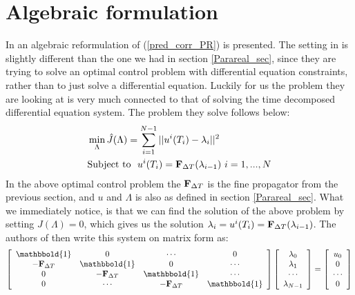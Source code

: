 \section{Algebraic formulation}\label{algebraic_sec}
In \cite{maday2002parareal} an algebraic reformulation of (\ref{pred_corr_PR}) is presented. The setting in \cite{maday2002parareal} is slightly different than the one we had in section \ref{Parareal_sec}, since they are trying to solve an optimal control problem with differential equation constraints, rather than to just solve a differential equation. Luckily for us the problem they are looking at is very much connected to that of solving the time decomposed differential equation system. The problem they solve follows below:
\begin{align*}
&\min_{\Lambda}\hat{J}(\Lambda) = \sum_{i=1}^{N-1} ||u^{i}(T_{i})-\lambda_{i}||^2 \\
&\textrm{Subject to } \ u^{i}(T_{i}) = \bold F_{\Delta T}(\lambda_{i-1}) \ i=1,...,N
\end{align*}
In the above optimal control problem the $\bold F_{\Delta T}$ is the fine propagator from the previous section, and $u$ and $\Lambda$ is also as defined in section \ref{Parareal_sec}. What we immediately notice, is that we can find the solution of the above problem by setting $J(\Lambda)=0$, which gives us the solution $\lambda_{i}= u^{i}(T_{i})=\bold F_{\Delta T}(\lambda_{i-1})$. The authors of \cite{maday2002parareal} then write this system on matrix form as:
\begin{align}
  \left[ \begin{array}{cccc}
   \mathbbold{1} & 0 & \cdots & 0 \\  
   -\bold{F}_{\Delta T} & \mathbbold{1} & 0 & \cdots \\ 
   0 &-\bold{F}_{\Delta T} & \mathbbold{1}  & \cdots \\
   0 &\cdots &-\bold{F}_{\Delta T} & \mathbbold{1}  \\
   \end{array}  \right] 
   \left[ \begin{array}{c}
   \lambda_0 \\
   \lambda_1 \\
   \cdots \\
   \lambda_{N-1} \\
   \end{array}  \right] =
   \left[ \begin{array}{c}
   u_0 \\
   0 \\
   \cdots \\
   0 \\
   \end{array}  \right] \label{vir_mat_form_sys }
\end{align}
